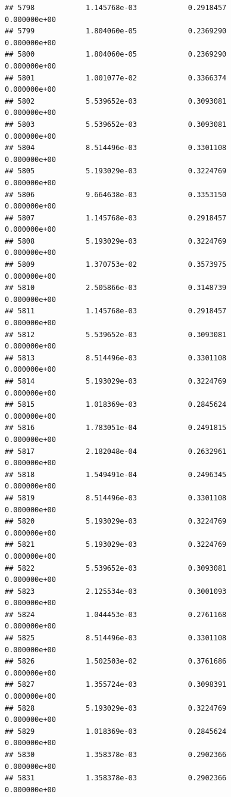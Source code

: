 \documentclass[
]{article}
\begin{document}
\begin{verbatim}
## 5798            1.145768e-03            0.2918457            0.000000e+00
## 5799            1.804060e-05            0.2369290            0.000000e+00
## 5800            1.804060e-05            0.2369290            0.000000e+00
## 5801            1.001077e-02            0.3366374            0.000000e+00
## 5802            5.539652e-03            0.3093081            0.000000e+00
## 5803            5.539652e-03            0.3093081            0.000000e+00
## 5804            8.514496e-03            0.3301108            0.000000e+00
## 5805            5.193029e-03            0.3224769            0.000000e+00
## 5806            9.664638e-03            0.3353150            0.000000e+00
## 5807            1.145768e-03            0.2918457            0.000000e+00
## 5808            5.193029e-03            0.3224769            0.000000e+00
## 5809            1.370753e-02            0.3573975            0.000000e+00
## 5810            2.505866e-03            0.3148739            0.000000e+00
## 5811            1.145768e-03            0.2918457            0.000000e+00
## 5812            5.539652e-03            0.3093081            0.000000e+00
## 5813            8.514496e-03            0.3301108            0.000000e+00
## 5814            5.193029e-03            0.3224769            0.000000e+00
## 5815            1.018369e-03            0.2845624            0.000000e+00
## 5816            1.783051e-04            0.2491815            0.000000e+00
## 5817            2.182048e-04            0.2632961            0.000000e+00
## 5818            1.549491e-04            0.2496345            0.000000e+00
## 5819            8.514496e-03            0.3301108            0.000000e+00
## 5820            5.193029e-03            0.3224769            0.000000e+00
## 5821            5.193029e-03            0.3224769            0.000000e+00
## 5822            5.539652e-03            0.3093081            0.000000e+00
## 5823            2.125534e-03            0.3001093            0.000000e+00
## 5824            1.044453e-03            0.2761168            0.000000e+00
## 5825            8.514496e-03            0.3301108            0.000000e+00
## 5826            1.502503e-02            0.3761686            0.000000e+00
## 5827            1.355724e-03            0.3098391            0.000000e+00
## 5828            5.193029e-03            0.3224769            0.000000e+00
## 5829            1.018369e-03            0.2845624            0.000000e+00
## 5830            1.358378e-03            0.2902366            0.000000e+00
## 5831            1.358378e-03            0.2902366            0.000000e+00

\end{verbatim}
\end{document}
